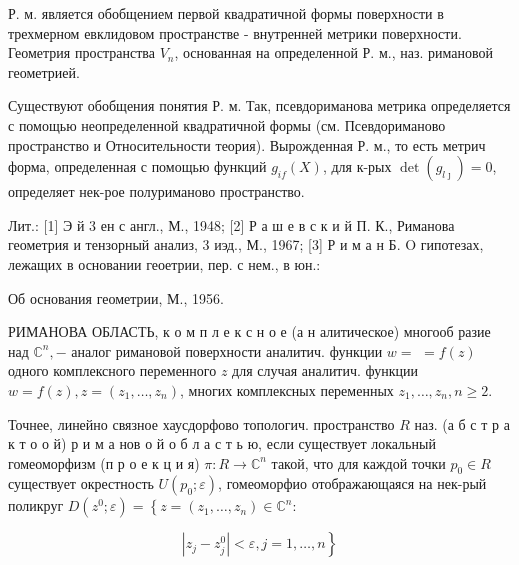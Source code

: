 \documentclass[10pt]{article}
\begin{document}
Р. м. является обобщением первой квадратичной формы поверхности в трехмерном евклидовом пространстве - внутренней метрики поверхности. Геометрия пространства $V_{n}$, основанная на определенной Р. м., наз. римановой геометрией.



Существуют обобщения понятия Р. м. Так, псевдориманова метрика определяется с помощью неопределенной квадратичной формы (см. Псевдориманово пространство и Относительности теория). Вырожденная Р. м., то есть метрич форма, определенная с помощью функций $g_{i f}(X)$, для к-рых $\operatorname{det}\left(g_{l \jmath}\right)=0$, определяет нек-рое полуриманово пространство.



Лит.: [1] Э й 3 ен с англ., М., 1948; [2] Р а ш е в с к и й П. К., Риманова геометрия и тензорный анализ, 3 иэд., М., 1967; [3] Р и м а н Б. O гипотезах, лежащих в основании геоетрии, пер. с нем., в юн.:

Об основания геометрии, М., 1956.



РИМАНОВА ОБЛАСТЬ, к о м п л е к с н о е (а н алитическое) многооб разие над $\mathbb{C}^{n},-$ аналог римановой поверхности аналитич. функции $w=$ $=f(z)$ одного комплексного переменного $z$ для случая аналитич. функции $w=f(z), z=\left(z_{1}, \ldots, z_{n}\right)$, многих комплексных переменных $z_{1}, \ldots, z_{n}, n \geqslant 2$.



Точнее, линейно связное хаусдорфово топологич. пространство $R$ наз. (а б с т р а к т о о й) р и м а нов о й о б л а с т ь ю, если существует локальный гомеоморфизм (п р о е к ц и я) $\pi: R \rightarrow \mathbb{C}^{n}$ такой, что для каждой точки $p_{0} \in R$ существует окрестность $U\left(p_{0} ; \varepsilon\right)$, гомеоморфио отображающаяся на нек-рый поликруг $D\left(z^{0} ; \varepsilon\right)=\left\{z=\left(z_{1}, \ldots, z_{n}\right) \in \mathbb{C}^{n}:\right.$



\[

\left.\left|z_{j}-z_{j}^{0}\right|<\varepsilon, j=1, \ldots, n\right\}

\]
\end{document}
